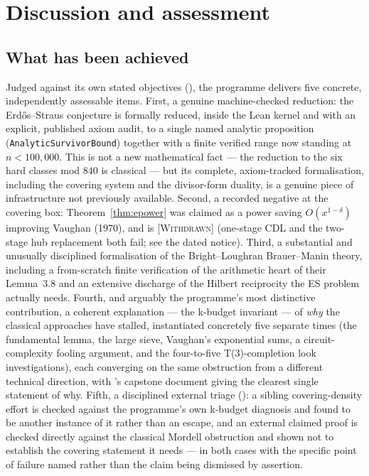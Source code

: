 \documentclass[11pt]{article}
\theoremstyle{plain}
\theoremstyle{definition}
\theoremstyle{remark}
\newcommand{\WITHDRAWN}{\textcolor{negative}{\textsc{[Withdrawn]}}}
\newcommand{\lean}[1]{\texttt{#1}}
\renewcommand{\_}{\textunderscore\allowbreak}
\begin{document}
\section{Discussion and assessment}
\label{sec:discussion}

\subsection{What has been achieved}

Judged against its own stated objectives (), the programme delivers five
concrete, independently assessable items. First, a genuine machine-checked reduction: the
Erd\H{o}s--Straus conjecture is formally reduced, inside the Lean kernel and with an explicit,
published axiom audit, to a single named analytic proposition
(\lean{AnalyticSurvivorBound}) together with a finite verified range now standing at
$n<100{,}000$. This is not a new mathematical fact — the reduction to the six hard classes mod
$840$ is classical — but its complete, axiom-tracked formalisation, including the covering
system and the divisor-form duality, is a genuine piece of infrastructure not previously
available. Second, a recorded negative at the covering box: Theorem~\ref{thm:epower} was
claimed as a power saving $O(x^{1-\delta})$ improving Vaughan (1970), and is \WITHDRAWN{}
(one-stage CDL and the two-stage hub replacement both fail; see the dated notice).
Third, a substantial and unusually disciplined formalisation of the Bright--Loughran
Brauer--Manin theory, including a from-scratch finite verification of the arithmetic heart of
their Lemma~3.8 and an extensive discharge of the Hilbert reciprocity the ES problem actually
needs. Fourth, and arguably the programme's most distinctive contribution, a coherent explanation
— the k-budget invariant — of \emph{why} the classical approaches have stalled, instantiated
concretely five separate times (the fundamental lemma, the large sieve, Vaughan's exponential
sums, a circuit-complexity fooling argument, and the four-to-five T(3)-completion look
investigations), each converging on the same obstruction from a different technical direction,
with 's capstone document giving the clearest single statement of
why. Fifth, a disciplined external triage (): a sibling covering-density effort
is checked against the programme's own k-budget diagnosis and found to be another instance of it
rather than an escape, and an external claimed proof is checked directly against the classical
Mordell obstruction and shown not to establish the covering statement it needs — in both cases
with the specific point of failure named rather than the claim being dismissed by assertion.
\end{document}
